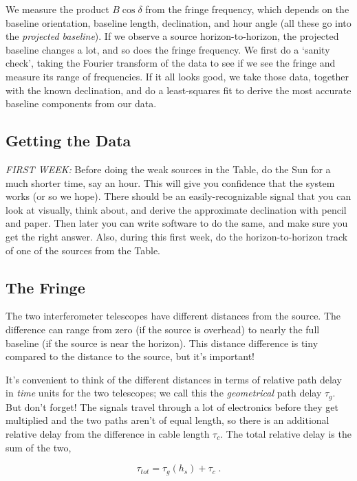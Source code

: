 \documentclass[11pt,preprint]{aastex}
\begin{document}
We measure the product $B \cos \delta$ from the fringe frequency, which
depends on the baseline orientation, baseline length, declination, and
hour angle (all these go into the {\it projected baseline}). If we
observe a source horizon-to-horizon, the projected baseline changes a
lot, and so does the fringe frequency. We first do a `sanity check',
taking the Fourier transform of the data to see if we see the fringe and
measure its range of frequencies. If it all looks good, we take those
data, together with the known declination, and do a least-squares fit to
derive the most accurate baseline components
from our data.

\subsection{Getting the Data}

	{\it FIRST WEEK:} Before doing the weak sources in the Table, do
the Sun for a much shorter time, say an hour. This will give you
confidence that the system works (or so we hope). There should be an
easily-recognizable signal that you can look at visually, think about,
and derive the approximate declination with pencil and paper. Then later
you can write software to do the same, and make sure you get the right
answer.  Also, during this first week, do the horizon-to-horizon track
of one of the sources from the Table.

\subsection{The Fringe} \label{details}

	The two interferometer telescopes have different distances from
the source. The difference can range from zero (if the source is
overhead) to nearly the full baseline (if the source is near the
horizon). This distance difference is tiny compared to the distance to
the source, but it's important! 

	It's convenient to think of the different distances in terms of 
relative path delay in {\it time} units for the two telescopes; we call
this the {\it geometrical} path delay $\tau_g$.  But don't forget! The
signals travel through a lot of electronics before they get multiplied
and the two paths aren't of equal length, so there is an additional
relative delay from the difference in cable length $\tau_c$.  The total
relative delay is the sum of the two,

\begin{equation}
 \tau_{tot} = \tau_g(h_s) + \tau_c \; . 
\end{equation}
\end{document}
